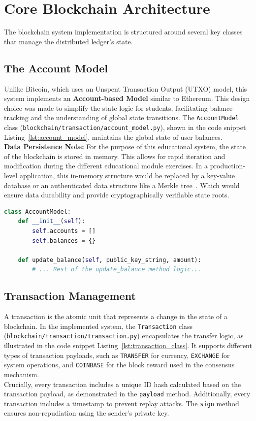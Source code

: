 \section{Core Blockchain Architecture} \label{ch4_core_architecture}

The blockchain system implementation is structured around several key classes that manage the distributed ledger's state.

\subsection{The Account Model} \label{ch4_account_model}
Unlike Bitcoin, which uses an Unspent Transaction Output (UTXO) model, this system implements an \textbf{Account-based Model} similar to Ethereum. This design choice was made to simplify the state logic for students, facilitating balance tracking and the understanding of global state transitions.
The \texttt{AccountModel} class (\texttt{blockchain/transaction/account\_model.py}), shown in the code snippet Listing~\ref{lst:account_model}, maintains the global state of user balances. \\\textbf{Data Persistence Note:}
For the purpose of this educational system, the state of the blockchain is stored in memory. This allows for rapid iteration and modification during the different educational module exercises. In a production-level application, this in-memory structure would be replaced by a key-value database or an authenticated data structure like a Merkle tree~\cite{merkleTrees}. Which would ensure data durability and provide cryptographically verifiable state roots.

\begin{lstlisting}[language=Python, caption=Account Model code snippet, label=lst:account_model]
class AccountModel:
    def __init__(self):
        self.accounts = []
        self.balances = {}

    def update_balance(self, public_key_string, amount):
        # ... Rest of the update_balance method logic...
\end{lstlisting}

\newpage
\subsection{Transaction Management} \label{ch4_transaction_impl}
A transaction is the atomic unit that represents a change in the state of a blockchain. In the implemented system, the \texttt{Transaction} class \\(\texttt{blockchain/transaction/transaction.py}) encapsulates the transfer logic, as illustrated in the code snippet Listing~\ref{lst:transaction_class}. It supports different types of transaction payloads, such as \texttt{TRANSFER} for currency, \texttt{EXCHANGE} for system operations, and \texttt{COINBASE} for the block reward used in the consensus mechanism. \\Crucially, every transaction includes a unique ID hash calculated based on the transaction payload, as demonstrated in the \texttt{payload} method. Additionally, every transaction includes a timestamp to prevent replay attacks. The \texttt{sign} method ensures non-repudiation using the sender's private key.

